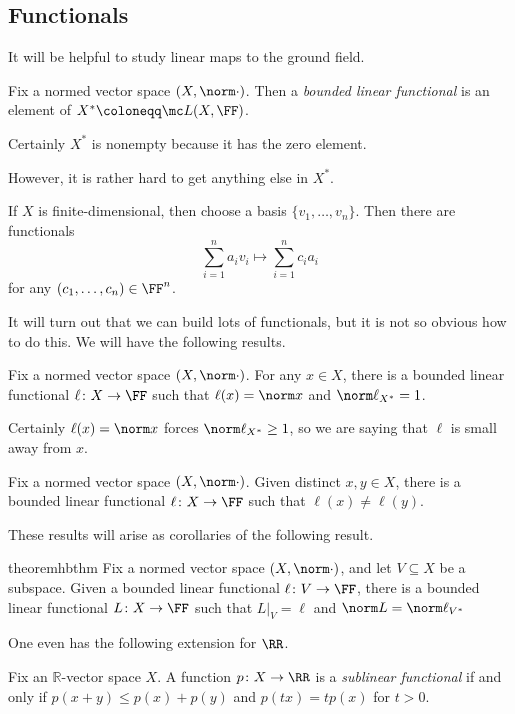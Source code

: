 \documentclass[../notes.tex]{subfiles}
\begin{document}
\subsection{Functionals}
It will be helpful to study linear maps to the ground field.
\begin{definition}[functional]
	Fix a normed vector space $(X,\norm\cdot)$. Then a \textit{bounded linear functional} is an element of $X^*\coloneqq\mc L(X,\FF)$.
\end{definition}
\begin{example}
	Certainly $X^*$ is nonempty because it has the zero element.
\end{example}
However, it is rather hard to get anything else in $X^*$.
\begin{example}
	If $X$ is finite-dimensional, then choose a basis $\{v_1,\ldots,v_n\}$. Then there are functionals
	\[\sum_{i=1}^na_iv_i\mapsto\sum_{i=1}^nc_ia_i\]
	for any $(c_1,\ldots,c_n)\in\FF^n$.
\end{example}
It will turn out that we can build lots of functionals, but it is not so obvious how to do this. We will have the following results.
\begin{corollary}
	Fix a normed vector space $(X,\norm\cdot)$. For any $x\in X$, there is a bounded linear functional $\ell\colon X\to\FF$ such that $\ell(x)=\norm x$ and $\norm\ell_{X^*}=1$.
\end{corollary}
\begin{remark}
	Certainly $\ell(x)=\norm x$ forces $\norm\ell_{X^*}\ge1$, so we are saying that $\ell$ is small away from $x$.
\end{remark}
\begin{corollary}
	Fix a normed vector space $(X,\norm\cdot)$. Given distinct $x,y\in X$, there is a bounded linear functional $\ell\colon X\to\FF$ such that $\ell(x)\ne\ell(y)$.
\end{corollary}
These results will arise as corollaries of the following result.
\begin{restatable}{theorem}{hbthm} \label{thm:hb}
	Fix a normed vector space $(X,\norm\cdot)$, and let $V\subseteq X$ be a subspace. Given a bounded linear functional $\ell\colon V\to\FF$, there is a bounded linear functional $L\colon X\to\FF$ such that $L|_V=\ell$ and $\norm L=\norm\ell_{V^*}$
\end{restatable}
One even has the following extension for $\RR$.
\begin{definition}
	Fix an $\mathbb R$-vector space $X$. A function $p\colon X\to\RR$ is a \textit{sublinear functional} if and only if $p(x+y)\le p(x)+p(y)$ and $p(tx)=tp(x)$ for $t>0$.
\end{definition}
\end{document}
